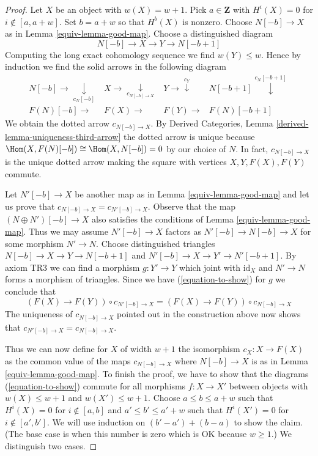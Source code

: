 \begin{proof}
\medskip\noindent
Let $X$ be an object with $w(X) = w + 1$. Pick $a \in \mathbf{Z}$ with
$H^i(X) = 0$ for $i \not \in [a, a + w]$. Set $b = a + w$ so that
$H^b(X)$ is nonzero. Choose $N[-b] \to X$ as in Lemma \ref{equiv-lemma-good-map}.
Choose a distinguished diagram
$$
N[-b] \to X \to Y \to N[-b + 1]
$$
Computing the long exact cohomology sequence we find
$w(Y) \leq w$. Hence by induction we find the solid arrows
in the following diagram
$$
\begin{array}{cccc}N[-b] \longrightarrow\underset{c_N[-b]}{\downarrow} & X \longrightarrow\underset{c_{N[-b] \to X}}{\downarrow} & Y \longrightarrow\overset{c_Y}{\downarrow} & N[-b + 1] \overset{c_N[-b + 1]}{\downarrow} \\ F(N)[-b] \longrightarrow & F(X) \longrightarrow & F(Y) \longrightarrow & F(N)[-b + 1]\end{array}
$$
We obtain the dotted arrow $c_{N[-b] \to X}$.
By Derived Categories, Lemma \ref{derived-lemma-uniqueness-third-arrow}
the dotted arrow is unique because $\Hom(X, F(N)[-b]) \cong \Hom(X, N[-b]) = 0$
by our choice of $N$. In fact, $c_{N[-b] \to X}$ is the unique dotted
arrow making the square with vertices $X, Y, F(X), F(Y)$ commute.

\medskip\noindent
Let $N'[-b] \to X$ be another map as in Lemma \ref{equiv-lemma-good-map}
and let us prove that $c_{N[-b] \to X} = c_{N'[-b] \to X}$.
Observe that the map $(N \oplus N')[-b] \to X$ also satisfies the
conditions of Lemma \ref{equiv-lemma-good-map}.
Thus we may assume $N'[-b] \to X$ factors
as $N'[-b] \to N[-b] \to X$ for some morphism $N' \to N$.
Choose distinguished triangles $N[-b] \to X \to Y \to N[-b + 1]$ and
$N'[-b] \to X \to Y' \to N'[-b + 1]$. By axiom TR3 we can find
a morphism $g : Y' \to Y$ which joint with $\text{id}_X$ and $N' \to N$
forms a morphism of triangles. Since we have
(\ref{equation-to-show}) for $g$ we conclude that
$$
(F(X) \to F(Y)) \circ c_{N'[-b] \to X} = (F(X) \to F(Y)) \circ c_{N[-b] \to X}
$$
The uniqueness of $c_{N[-b] \to X}$ pointed out in the construction
above now shows that $c_{N'[-b] \to X} = c_{N[-b] \to X}$.

\medskip\noindent
Thus we can now define for $X$ of width $w + 1$ the isomorphism
$c_X : X \to F(X)$ as the common value of the maps $c_{N[-b] \to X}$
where $N[-b] \to X$ is as in Lemma \ref{equiv-lemma-good-map}. To finish
the proof, we have to show that the diagrams (\ref{equation-to-show})
commute for all morphisms $f : X \to X'$ between objects with $w(X) \leq w + 1$
and $w(X') \leq w + 1$. Choose $a \leq b \leq a + w$ such that
$H^i(X) = 0$ for $i \not \in [a, b]$ and
$a' \leq b' \leq a' + w$ such that $H^i(X') = 0$ for
$i \not \in [a', b']$. We will use induction on
$(b' - a') + (b - a)$ to show the claim. (The base case
is when this number is zero which is OK because $w \geq 1$.)
We distinguish two cases.


\end{proof}
